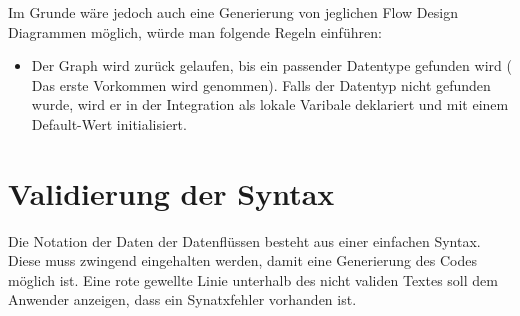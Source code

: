 \documentclass[a4paper,12pt,oneside]{book}
\begin{document}
Im Grunde wäre jedoch auch eine Generierung von jeglichen Flow Design Diagrammen
möglich, würde man folgende Regeln einführen:
\begin{itemize}
\item Der Graph wird zurück gelaufen, bis ein passender Datentype
gefunden wird ( Das erste Vorkommen wird genommen). Falls der Datentyp nicht
gefunden wurde, wird er in der Integration als lokale Varibale deklariert und mit einem
Default-Wert initialisiert.
\end{itemize}

\section{Validierung der Syntax}
\label{sec:orgheadline27}
Die Notation der Daten der Datenflüssen besteht aus einer einfachen Syntax. Diese muss zwingend eingehalten
 werden, damit eine Generierung des Codes möglich ist.
 Eine rote gewellte Linie unterhalb des nicht validen Textes soll dem Anwender
 anzeigen, dass ein Synatxfehler vorhanden ist.
\end{document}
